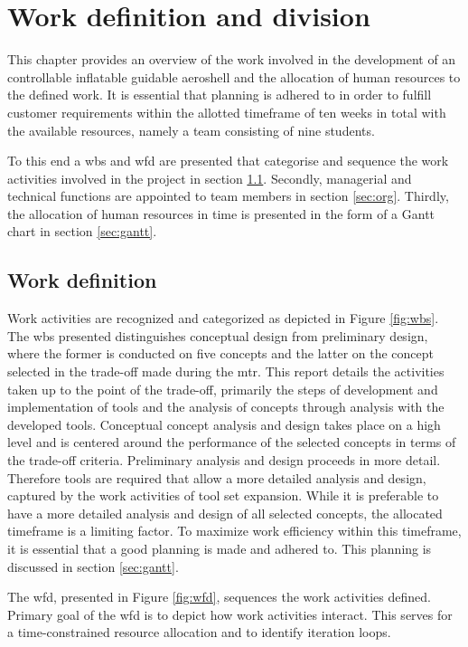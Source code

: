 \section{Work definition and division}
\label{ch:wdd}
This chapter provides an overview of the work involved in the development of an controllable inflatable guidable aeroshell and the allocation of human resources to the defined work. It is essential that planning is adhered to in order to fulfill customer requirements within the allotted timeframe of ten weeks in total with the available resources, namely a team consisting of nine students. 

To this end a \gls{wbs} and \gls{wfd} are presented that categorise and sequence the work activities involved in the project in section \ref{sec:work}. Secondly, managerial and technical functions are appointed to team members in section \ref{sec:org}. Thirdly, the allocation of human resources in time is presented in the form of a Gantt chart in section \ref{sec:gantt}.

\subsection{Work definition}
\label{sec:work}
Work activities are recognized and categorized as depicted in Figure  \ref{fig:wbs}. The \gls{wbs} presented distinguishes conceptual design from preliminary design, where the former is conducted on five concepts and the latter on the concept selected in the trade-off made during the \acrfull{mtr}. This report details the activities taken up to the point of the trade-off, primarily the steps of development and implementation of tools and the analysis of concepts through analysis with the developed tools. Conceptual concept analysis and design takes place on a high level and is centered around the performance of the selected concepts in terms of the trade-off criteria. Preliminary analysis and design proceeds in more detail. Therefore tools are required that allow a more detailed analysis and design, captured by the work activities of tool set expansion. While it is preferable to have a more detailed analysis and design of all selected concepts, the allocated timeframe is a limiting factor. To maximize work efficiency within this timeframe, it is essential that a good planning is made and adhered to. This planning is discussed in section \ref{sec:gantt}.

The \gls{wfd}, presented in Figure  \ref{fig:wfd}, sequences the work activities defined. Primary goal of the \gls{wfd} is to depict how work activities interact. This serves for a time-constrained resource allocation and to identify iteration loops.



